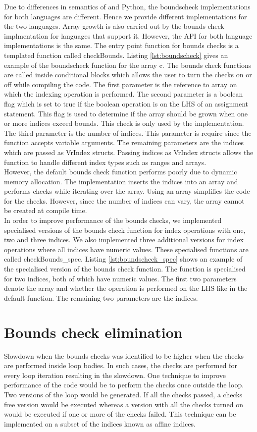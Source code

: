 Due to differences in semantics of \matlab and Python, the boundscheck implementations for both languages are different. Hence we provide different implementations for the two languages. Array growth is also carried out by the bounds check implmentation for languages that support it. However, the API for both language implementations is the same. The entry point function for bounds checks is a templated function called checkBounds. Listing \ref{lst:boundscheck} gives an example of the boundscheck function for the array c. The bounds check functions are called inside conditional blocks which allows the user to turn the checks on or off while compiling the code. The first parameter is the reference to array on which the indexing operation is performed. The second parameter is a boolean flag which is set to true if the boolean operation is on the LHS of an assignment statement. This flag is used to determine if the array should be grown when one or more indices exceed bounds. This check is only used by the \matlab implementation. The third parameter is the number of indices. This parameter is require since the function accepts variable arguments. The remaining parameters are the indices which are passed as VrIndex structs. Passing indices as VrIndex structs allows the function to handle different index types such as ranges and arrays. \\
However, the default bounds check function performs poorly due to dynamic memory allocation. The implementation inserts the indices into an array and performs checks while iterating over the array. Using an array simplifies the code for the checks. However, since the number of indices can vary, the array cannot be created at compile time.\\
In order to improve performance of the bounds checks, we implemented specialised versions of the bounds check function for index operations with one, two and three indices. We also implemented three additional versions for index operations where all indices have numeric values. These specialised functions are called checkBounds\_spec. Listing \ref{lst:boundscheck_spec} shows an example of the specialised version of the bounds check function. The function is specialised for two indices, both of which have numeric values. The first two parameters denote the array and whether the operation is performed on the LHS like in the default function. The remaining two parameters are the indices. 
\section{Bounds check elimination}
Slowdown when the bounds checks was identified to be higher when the checks are performed inside loop bodies. In such cases, the checks are performed for every loop iteration resulting in the slowdown. One technique to improve performance of the code would be to perform the checks once outside the loop. Two versions of the loop would be generated. If all the checks passed, a checks free version would be executed whereas a version with all the checks turned on would be executed if one or more of the checks failed. This technique can be implemented on a subset of the indices known as affine indices. 
